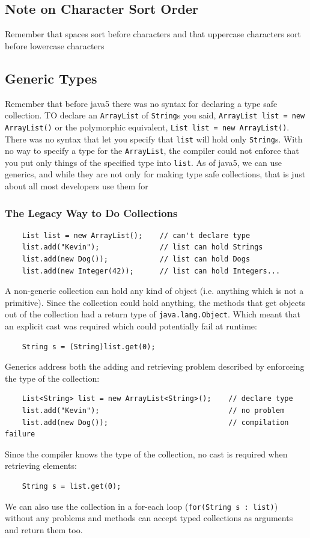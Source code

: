 \subsection{Note on Character Sort Order}
Remember that spaces sort before characters and that uppercase characters sort 
before lowercase characters

\subsection{Generic Types}
Remember that before java5 there was no syntax for declaring a type safe 
collection. TO declare an \verb#ArrayList# of \verb#String#s you said, 
\verb#ArrayList list = new ArrayList()# or the polymorphic equivalent, 
\verb#List list = new ArrayList()#. There was no syntax that let you specify 
that \verb#list# will hold only \verb#String#s. With no way to specify a type 
for the \verb#ArrayList#, the compiler could not enforce that you put only 
things of the specified type into \verb#list#. As of java5, we can use 
generics, and while they are not only for making type safe collections, that is 
just about all most developers use them for

\subsubsection{The Legacy Way to Do Collections}
\begin{verbatim}
    List list = new ArrayList();    // can't declare type
    list.add("Kevin");              // list can hold Strings
    list.add(new Dog());            // list can hold Dogs
    list.add(new Integer(42));      // list can hold Integers...
\end{verbatim}
A non-generic collection can hold any kind of object (i.e. anything which is 
not a primitive). Since the collection could hold anything, the methods that 
get objects out of the collection had a return type of \verb#java.lang.Object#.  
Which meant that an explicit cast was required which could potentially fail at 
runtime:
\begin{verbatim}
    String s = (String)list.get(0);
\end{verbatim}
Generics address both the adding and retrieving problem described by enforceing 
the type of the collection:
\begin{verbatim}
    List<String> list = new ArrayList<String>();    // declare type
    list.add("Kevin");                              // no problem
    list.add(new Dog());                            // compilation failure
\end{verbatim}
Since the compiler knows the type of the collection, no cast is required when 
retrieving elements:
\begin{verbatim}
    String s = list.get(0);
\end{verbatim}
We can also use the collection in a for-each loop (\verb#for(String s : list)#) 
without any problems and methods can accept typed collections as arguments and 
return them too.

